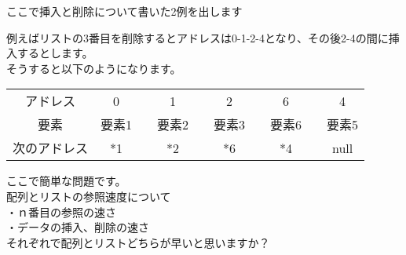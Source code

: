ここで挿入と削除について書いた2例を出します



例えばリストの3番目を削除するとアドレスは0-1-2-4となり、その後2-4の間に挿入するとします。\\
そうすると以下のようになります。
\begin{table}[htb]
\begin{center}
\begin{tabular}{|c|c|c|c|c|c|c|c|c|c|}
\cline{1-1}\cline{2-2}\cline{4-4}\cline{6-6}\cline{8-8}\cline{10-10}
アドレス & 0 && 1 && 2 && 6 && 4 \\ \cline{1-1}\cline{2-2}\cline{4-4}\cline{6-6}\cline{8-8}\cline{10-10}
要素 & 要素1 && 要素2 && 要素3 && 要素6 && 要素5\\ \cline{1-1}\cline{2-2}\cline{4-4}\cline{6-6}\cline{8-8}\cline{10-10}
次のアドレス & *1 && *2 && *6 && *4 && null   \\ 
\cline{1-1}\cline{2-2}\cline{4-4}\cline{6-6}\cline{8-8}\cline{10-10}
\end{tabular}
\end{center}
\end{table}
ここで簡単な問題です。\\
配列とリストの参照速度について\\
・ｎ番目の参照の速さ\\
・データの挿入、削除の速さ\\
それぞれで配列とリストどちらが早いと思いますか？


